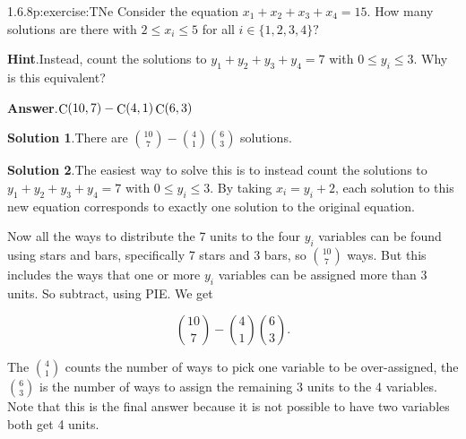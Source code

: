 \documentclass[twoside,11pt,]{book}
\newcommand{\blocktitlefont}{\relax}
\numberwithin{equation}{chapter}
\begin{document}
\begin{divisionsolution}{1.6.8}{}{p:exercise:TNe}%
Consider the equation \(x_1 + x_2 + x_3 + x_4 = 15\text{.}\) How many solutions are there with \(2 \le x_i \le 5\) for all \(i \in \{1,2,3,4\}\text{?}\)%
\par\smallskip%
\noindent\textbf{\blocktitlefont Hint}.\quad{}Instead, count the solutions to \(y_1 + y_2 + y_3 + y_4 = 7\) with \(0 \le y_i \le 3\text{.}\)  Why is this equivalent?%
\par\smallskip%
\noindent\textbf{\blocktitlefont Answer}.\quad{}\(\mathop{\rm C}\nolimits\!\left(10,7\right)-\mathop{\rm C}\nolimits\!\left(4,1\right)\mathop{\rm C}\nolimits\!\left(6,3\right)\)%
\par\smallskip%
\noindent\textbf{\blocktitlefont Solution 1}.\quad{}There are \({10 \choose 7} - {4\choose 1} {6 \choose 3}\) solutions.%
\par\smallskip%
\noindent\textbf{\blocktitlefont Solution 2}.\quad{}The easiest way to solve this is to instead count the solutions to \(y_1 + y_2 + y_3 + y_4 = 7\) with \(0 \le y_i \le 3\text{.}\) By taking \(x_i = y_i+2\text{,}\) each solution to this new equation corresponds to exactly one solution to the original equation.%
\par
Now all the ways to distribute the 7 units to the four \(y_i\) variables can be found using stars and bars, specifically 7 stars and 3 bars, so \({10 \choose 7}\) ways. But this includes the ways that one or more \(y_i\) variables can be assigned more than 3 units. So subtract, using PIE. We get%
\par
%
\begin{equation*}
{10 \choose 7} - {4\choose 1} {6 \choose 3}
\text{.}
\end{equation*}
%
\par
The \({4 \choose 1}\) counts the number of ways to pick one variable to be over-assigned, the \({6 \choose 3}\) is the number of ways to assign the remaining 3 units to the 4 variables. Note that this is the final answer because it is not possible to have two variables both get 4 units.%
\end{divisionsolution}%
\end{document}
